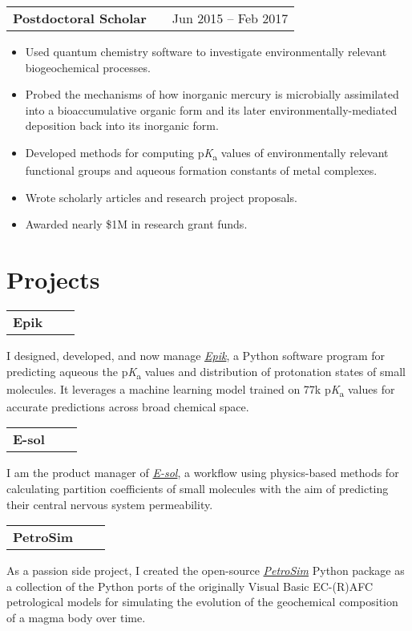 \documentclass[a4paper,12pt]{article}
\makeatletter
\newenvironment{jobtitle}[2]
    {
    \vspace{4pt}
    \begin{tabularx}{\linewidth}{@{}l X r@{}}
    \textbf{#1} & \hfill &  #2 \\[3.75pt]
    \end{tabularx}
    \begin{minipage}[t]{\linewidth}
    \begin{itemize}[nosep, after=\strut, leftmargin=1em, itemsep=3pt, label=--]
    }
    {
    \end{itemize}
    \vspace{8pt}
    \end{minipage}
    }
\newenvironment{projecttitle}[1]
    {
    \begin{tabularx}{\linewidth}{@{}l X r@{}}
    \textbf{#1} & \hfill \\[3.75pt]
    \end{tabularx}
    }
    {
    }
\newenvironment{projectdescription}[1]
    {
    \vspace{4pt}
    \begin{minipage}[t]{\linewidth}
    \begin{itemize}[nosep, after=\strut, leftmargin=1em, itemsep=3pt]
    }
    {
    \end{itemize}
    \vspace{-8pt}
    \end{minipage}
    }
\makeatother
\begin{document}
\begin{jobtitle}{Postdoctoral Scholar}{Jun 2015 -- Feb 2017}
    \item Used quantum chemistry software to investigate environmentally relevant biogeochemical processes.
    \item Probed the mechanisms of how inorganic mercury is microbially assimilated into a bioaccumulative organic form and its later environmentally-mediated deposition back into its inorganic form.
    \item Developed methods for computing p\textit{K}\textsubscript{a} values of environmentally relevant functional groups and aqueous formation constants of metal complexes.
    \item Wrote scholarly articles and research project proposals.
    \item Awarded nearly \$1M in research grant funds.
\end{jobtitle}
  
\section{Projects}

\begin{projecttitle}{Epik}
\end{projecttitle}
\begin{projectdescription}
\item I designed, developed, and now manage \href{https://www.schrodinger.com/platform/products/epik/}{\textit{Epik}}, a Python software program for predicting aqueous the p\textit{K}\textsubscript{a} values and distribution of protonation states of small molecules. It leverages a machine learning model trained on 77k p\textit{K}\textsubscript{a} values for accurate predictions across broad chemical space.  \\
\end{projectdescription}
\begin{projecttitle}{E-sol}
\end{projecttitle}
\begin{projectdescription}
\item I am the product manager of \href{https://pubs.acs.org/doi/abs/10.1021/acs.jcim.3c00150}{\textit{E-sol}}, a workflow using physics-based methods for calculating partition coefficients of small molecules with the aim of predicting their central nervous system permeability.  \\
\end{projectdescription}
\begin{projecttitle}{PetroSim}
\end{projecttitle}
\begin{projectdescription}
\item As a passion side project, I created the open-source \href{https://github.com/rynecjohnston/petrosim}{\textit{PetroSim}} Python package as a collection of the Python ports of the originally Visual Basic EC-(R)AFC petrological models for simulating the evolution of the geochemical composition of a magma body over time.  \\
\end{projectdescription}
\end{document}
